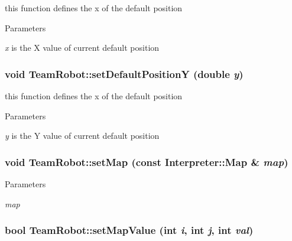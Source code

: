 this function defines the x of the default position 


\begin{DoxyParams}{Parameters}
\item[{\em x}]is the X value of current default position \end{DoxyParams}
\hypertarget{classTeamRobot_afeb86cb88b18030049d525d1d6790e6e}{
\subsubsection[{setDefaultPositionY}]{\setlength{\rightskip}{0pt plus 5cm}void TeamRobot::setDefaultPositionY (double {\em y})}}
\label{classTeamRobot_afeb86cb88b18030049d525d1d6790e6e}


this function defines the x of the default position 


\begin{DoxyParams}{Parameters}
\item[{\em y}]is the Y value of current default position \end{DoxyParams}
\hypertarget{classTeamRobot_ab8c92b6228aed8eef31d0b1b0fce8690}{
\subsubsection[{setMap}]{\setlength{\rightskip}{0pt plus 5cm}void TeamRobot::setMap (const {\bf Interpreter::Map} \& {\em map})}}
\label{classTeamRobot_ab8c92b6228aed8eef31d0b1b0fce8690}

\begin{DoxyParams}{Parameters}
\item[{\em map}]\end{DoxyParams}
\hypertarget{classTeamRobot_a28ee2460e7d465989bb0582782db851e}{
\subsubsection[{setMapValue}]{\setlength{\rightskip}{0pt plus 5cm}bool TeamRobot::setMapValue (int {\em i}, \/  int {\em j}, \/  int {\em val})}}
\label{classTeamRobot_a28ee2460e7d465989bb0582782db851e}

